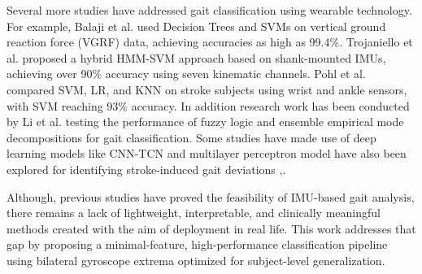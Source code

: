 Several more studies have addressed gait classification using wearable technology. For example, Balaji et al. \cite{ref29} used Decision Trees and SVMs 
on vertical ground reaction force (VGRF) data, achieving accuracies as high as 99.4\%. Trojaniello et al. \cite{ref30} proposed a hybrid HMM-SVM approach 
based on shank-mounted IMUs, achieving over 90\% accuracy using seven kinematic channels. Pohl et al. \cite{ref31} compared SVM, LR, and KNN on stroke 
subjects using wrist and ankle sensors, with SVM reaching 93\% accuracy. In addition research work has been conducted by Li et al. \cite{ref32}
testing the performance of fuzzy logic and ensemble empirical mode decompositions for gait classification. Some studies have made use of deep learning models 
like CNN-TCN and multilayer perceptron model have also been explored for identifying stroke-induced gait deviations \cite{ref33},\cite{ref34}. 

Although, previous studies have proved the feasibility of IMU-based gait analysis, there remains a lack of lightweight, interpretable, and clinically 
meaningful methods created with the aim of deployment in real life. This work addresses that gap by proposing a minimal-feature, high-performance 
classification pipeline using bilateral gyroscope extrema optimized for subject-level generalization.  
